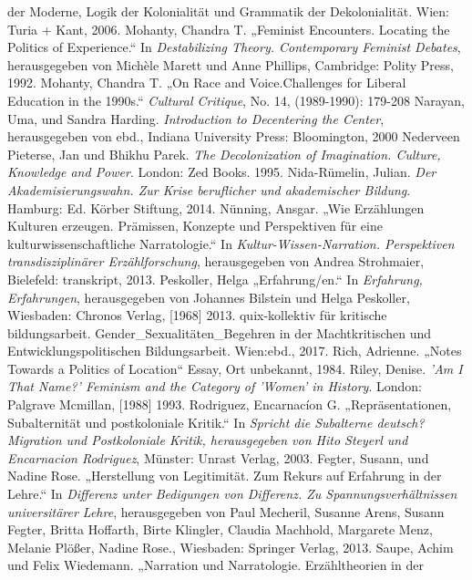 \begin{thebibliography}{100}
{der Moderne, Logik der Kolonialität und Grammatik der Dekolonialität}. Wien: Turia + Kant, 2006.
 Mohanty, Chandra T. „Feminist Encounters. Locating the
Politics of Experience.“ In \emph{Destabilizing
Theory. Contemporary Feminist Debates}, herausgegeben von Michèle Marett und Anne Phillips, Cambridge: Polity Press, 1992. 
 Mohanty, Chandra T. „On Race and Voice.Challenges for Liberal
Education in the 1990s.“ \emph{Cultural Critique}, No. 14, (1989-1990): 179-208
 Narayan, Uma, und Sandra  Harding. \emph{Introduction to
Decentering the Center}, herausgegeben von ebd., Indiana University Press: Bloomington, 2000
 Nederveen Pieterse, Jan und Bhikhu Parek. \emph{The Decolonization of Imagination. Culture,
Knowledge and Power}. London:  Zed Books. 1995.
 Nida-Rümelin, Julian. \emph{Der Akademisierungswahn. Zur Krise beruflicher und akademischer Bildung}. Hamburg: Ed. Körber Stiftung, 2014.
 Nünning, Ansgar. „Wie Erzählungen Kulturen erzeugen. Prämissen, Konzepte und Perspektiven für
eine kulturwissenschaftliche Narratologie.“ In \emph{Kultur-Wissen-Narration.
Perspektiven transdisziplinärer Erzählforschung}, herausgegeben von Andrea Strohmaier,  Bielefeld: transkript, 2013.
 Peskoller, Helga „Erfahrung/en.“  In \emph{Erfahrung,
Erfahrungen}, herausgegeben von  Johannes Bilstein und Helga Peskoller, Wiesbaden: Chronos Verlag, [1968] 2013.
 quix-kollektiv für kritische bildungsarbeit. Gender\_Sexualitäten\_Begehren in der Machtkritischen und Entwicklungspolitischen Bildungsarbeit. Wien:ebd., 2017.
 Rich, Adrienne. „Notes Towards a Politics of Location“ Essay, Ort unbekannt, 1984.
 Riley, Denise. \emph{'Am I That Name?' Feminism and the Category of 'Women' in History}. London: Palgrave Mcmillan, [1988] 1993.
 Rodriguez, Encarnacíon G. „Repräsentationen, Subalternität
und postkoloniale Kritik.“ In \emph{Spricht die Subalterne deutsch? Migration
  und Postkoloniale Kritik, herausgegeben von Hito Steyerl und Encarnacion
Rodriguez}, Münster: Unrast Verlag, 2003.
 Fegter, Susann, und Nadine Rose. „Herstellung von Legitimität. Zum Rekurs auf Erfahrung in der 
Lehre.“ In \emph{Differenz unter Bedigungen von Differenz. Zu Spannungsverhältnissen universitärer Lehre}, 
herausgegeben von Paul Mecheril, Susanne Arens, Susann Fegter, Britta Hoffarth, Birte Klingler, Claudia Machhold, Margarete Menz, Melanie Plößer, Nadine Rose., Wiesbaden: Springer Verlag, 2013. 
 Saupe, Achim und Felix Wiedemann. „Narration und Narratologie. Erzähltheorien in der

\end{thebibliography}
